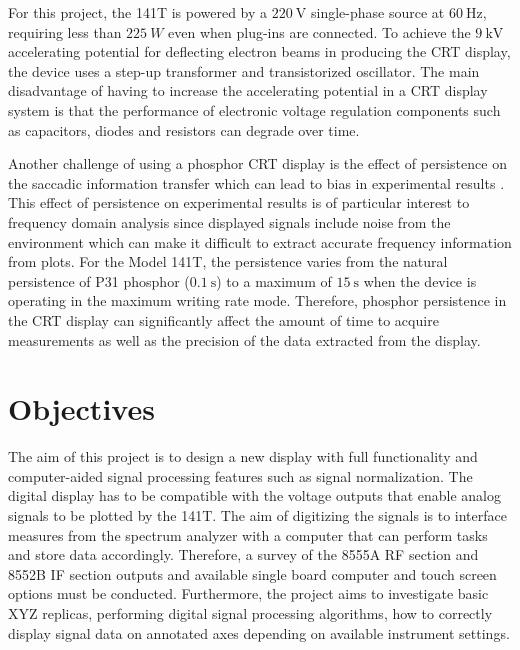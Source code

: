 \documentclass[class=report,11pt,crop=false]{standalone}
\begin{document}
For this project, the 141T is powered by a $\SI{220}{\volt}$ single-phase source at $\SI{60}{\hertz}$, requiring less than $\SI{225}{W}$ even when plug-ins are connected. To achieve the $\SI{9}{\kilo\volt}$ accelerating potential for deflecting electron beams in producing the CRT display, the device uses a step-up transformer and transistorized oscillator. The main disadvantage of having to increase the accelerating potential in a CRT display system is that the performance of electronic voltage regulation components such as capacitors, diodes and resistors can degrade over time. 

Another challenge of using a phosphor CRT display is the effect of persistence on the saccadic information transfer which can lead to bias in experimental results \cite{wolf1997}. This effect of persistence on experimental results is of particular interest to frequency domain analysis since displayed signals include noise from the environment which can make it difficult to extract accurate frequency information from plots. For the Model 141T, the persistence varies from the natural persistence of P31 phosphor ($\SI{0.1}{\second}$) to a maximum of $\SI{15}{\second}$ when the device is operating in the maximum writing rate mode. Therefore, phosphor persistence in the CRT display can significantly affect the amount of time to acquire measurements as well as the precision of the data extracted from the display.

\section{Objectives}
The aim of this project is to design a new display with full functionality and computer-aided signal processing features such as signal normalization. The digital display has to be compatible with the voltage outputs that enable analog signals to be plotted by the 141T. The aim of digitizing the signals is to interface measures from the spectrum analyzer with a computer that can perform tasks and store data accordingly. Therefore, a survey of the 8555A RF section and 8552B IF section outputs and available single board computer and touch screen options must be conducted. Furthermore, the project aims to investigate basic XYZ replicas, performing digital signal processing algorithms, how to correctly display signal data on annotated axes depending on available instrument settings.
\end{document}
